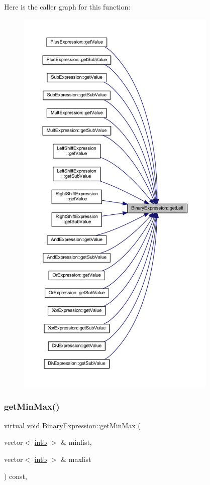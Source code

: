 Here is the caller graph for this function\+:
\nopagebreak
\begin{figure}[H]
\begin{center}
\leavevmode
\includegraphics[height=550pt]{class_binary_expression_abae7e8c5cbaa1158cc82f622fc9d54d4_icgraph}
\end{center}
\end{figure}
\mbox{\label{class_binary_expression_afbce1a4f9e87f25ed8d52792b4d40425}} 
\subsubsection{\texorpdfstring{getMinMax()}{getMinMax()}}
{\footnotesize\ttfamily virtual void Binary\+Expression\+::get\+Min\+Max (\begin{DoxyParamCaption}\item[{vector$<$ \mbox{\hyperlink{types_8h_aa925ba3e627c2df89d5b1cfe84fb8572}{intb}} $>$ \&}]{minlist,  }\item[{vector$<$ \mbox{\hyperlink{types_8h_aa925ba3e627c2df89d5b1cfe84fb8572}{intb}} $>$ \&}]{maxlist }\end{DoxyParamCaption}) const\hspace{0.3cm}{\ttfamily [inline]}, {\ttfamily [virtual]}}



